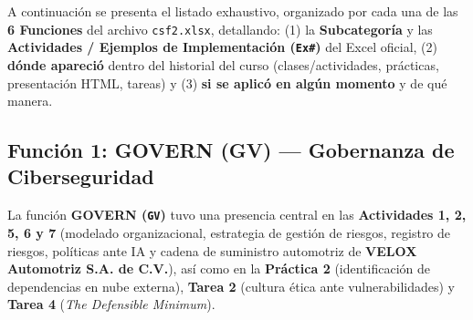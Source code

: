 \documentclass[letterpaper,11pt]{article}
\begin{document}
A continuación se presenta el listado exhaustivo, organizado por cada una de las \textbf{6 Funciones} del archivo \texttt{csf2.xlsx}, detallando: (1) la \textbf{Subcategoría} y las \textbf{Actividades / Ejemplos de Implementación (\texttt{Ex\#})} del Excel oficial, (2) \textbf{dónde apareció} dentro del historial del curso (clases/actividades, prácticas, presentación HTML, tareas) y (3) \textbf{si se aplicó en algún momento} y de qué manera.

\subsection{Función 1: GOVERN (GV) --- Gobernanza de Ciberseguridad}

La función \textbf{GOVERN (\texttt{GV})} tuvo una presencia central en las \textbf{Actividades 1, 2, 5, 6 y 7} (modelado organizacional, estrategia de gestión de riesgos, registro de riesgos, políticas ante IA y cadena de suministro automotriz de \textbf{VELOX Automotriz S.A. de C.V.}), así como en la \textbf{Práctica 2} (identificación de dependencias en nube externa), \textbf{Tarea 2} (cultura ética ante vulnerabilidades) y \textbf{Tarea 4} (\textit{The Defensible Minimum}).
\end{document}
